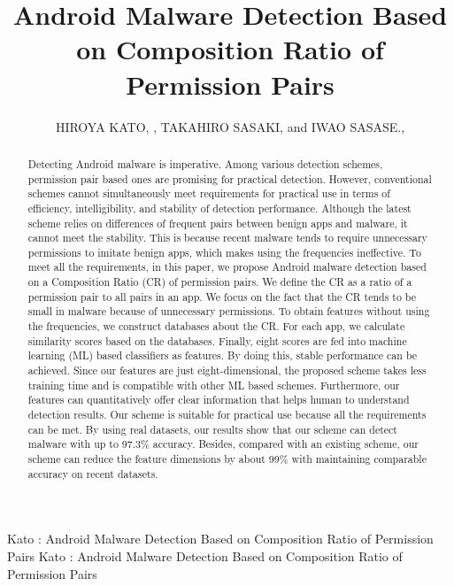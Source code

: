 \documentclass{ieeeaccess}
\newcommand{\TI}{Android Malware Detection Based on Composition Ratio of Permission Pairs}
\begin{document}

\title{Android Malware Detection Based on Composition Ratio of Permission Pairs} 

\author{
  \uppercase{Hiroya Kato}, ,
  \uppercase{Takahiro Sasaki},
  and \uppercase{Iwao Sasase}., }
\address[1]{Department of Information and Computer Science, Faculty of Science and Technology, Keio University 3-14-1 Hiyoshi, Kohoku, Yokohama, Kanagawa 223-8522, Japan}

\markboth
{Kato \headeretal: \TI}
{Kato \headeretal: \TI}


\begingroup
\newlength{\xfigwd}
\setlength{\xfigwd}{\textwidth}

\begin{abstract}
Detecting Android malware is imperative.
Among various detection schemes, permission pair based ones are promising for practical detection.
However, conventional schemes cannot simultaneously meet requirements for practical use in terms of efficiency, intelligibility, and stability of detection performance.
Although the latest scheme relies on differences of frequent pairs between benign apps and malware, it cannot meet the stability.
This is because recent malware tends to require unnecessary permissions to imitate benign apps, which makes using the frequencies ineffective.
To meet all the requirements, in this paper, we propose Android malware detection based on a Composition Ratio (CR) of permission pairs.
We define the CR as a ratio of a permission pair to all pairs in an app.
We focus on the fact that the CR tends to be small in malware because of unnecessary permissions.
To obtain features without using the frequencies, we construct databases about the CR.
For each app, we calculate similarity scores based on the databases.
Finally, eight scores are fed into machine learning (ML) based classifiers as features.
By doing this, stable performance can be achieved.
Since our features are just eight-dimensional, the proposed scheme takes less training time and is compatible with other ML based schemes.
Furthermore, our features can quantitatively offer clear information that helps human to understand detection results.
Our scheme is suitable for practical use because all the requirements can be met.
By using real datasets, our results show that our scheme can detect malware with up to 97.3\% accuracy.
Besides, compared with an existing scheme, our scheme can reduce the feature dimensions by about 99\% with maintaining comparable accuracy on recent datasets.
\end{abstract}
\end{document}
